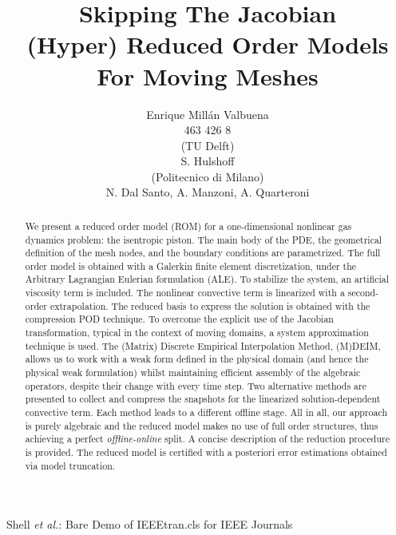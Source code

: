 \documentclass[a4paper, technote,compsoc]{IEEEtran}
\begin{document}
\onecolumn

\title{Skipping The Jacobian \\[5mm] \large{(Hyper) Reduced Order Models For Moving Meshes}}

\author{Enrique Millán Valbuena \\ \normalsize{463 426 8}
\\[5mm]
(TU Delft) 
\\[2mm]
S. Hulshoff 
\\[5mm]
(Politecnico di Milano) 
\\[2mm]
N. Dal Santo, A. Manzoni, A. Quarteroni
}%
        
{Shell \MakeLowercase{\textit{et al.}}: Bare Demo of IEEEtran.cls for IEEE Journals}

\maketitle

\begin{abstract}
   We present a reduced order model (ROM) for a one-dimensional nonlinear gas dynamics problem:
   the isentropic piston.
   The main body of the PDE, 
   the geometrical definition of the mesh nodes, 
   and the boundary conditions are parametrized.
   The full order model is obtained with a Galerkin finite element discretization,
   under the Arbitrary Lagrangian Eulerian formulation (ALE).
   To stabilize the system, an artificial viscosity term is included.
   The nonlinear convective term is linearized with a second-order extrapolation.
   The reduced basis to express the solution is obtained with the compression POD technique.
   To overcome the explicit use of the Jacobian transformation, 
   typical in the context of moving domains,
   a system approximation technique is used.
   The (Matrix) Discrete Empirical Interpolation Method, (M)DEIM, allows us
   to work with a weak form defined in the physical domain 
   (and hence the physical weak formulation)
   whilst maintaining efficient assembly of the algebraic operators, 
   despite their change with every time step.
   Two alternative methods are presented to collect and compress the snapshots 
   for the linearized solution-dependent convective term.
   Each method leads to a different offline stage.
   All in all, our approach is purely algebraic
   and the reduced model makes no use of full order structures, 
   thus achieving a perfect \textit{offline-online} split.
   A concise description of the reduction procedure is provided.
   The reduced model is certified with a posteriori error estimations obtained via model truncation.
\end{abstract}
\end{document}
